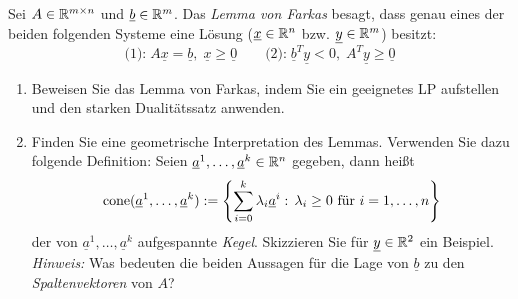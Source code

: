 \documentclass[11pt,german,a4paper,parskip=half-]{scrartcl}
\renewcommand{\u}[1]{\ensuremath{\underline{#1}}} %
\begin{document}
\begin{exercise}{4}
Sei $A \in \mathbb{R}^{m\times n}$ und $\u b \in \R^m$. Das \emph{Lemma von Farkas} besagt, dass genau eines der beiden
folgenden Systeme eine Lösung ($\u x \in \R^n$ bzw. $\u y \in \R^m$) besitzt:
\[ \text{(1):}\; A \u x = \u b,\; \u x \geq \u 0 \qquad \text{(2):}\;\u b^T \u y < 0,\; A^T \u y  \geq \u 0\]
\begin{enumerate}
 \item Beweisen Sie das Lemma von Farkas, indem Sie ein geeignetes LP aufstellen und den starken Dualitätssatz anwenden.
 \item Finden Sie eine geometrische Interpretation des Lemmas. Verwenden Sie dazu folgende Definition: Seien $\u a^1,\dotsc, \u a^k \in \R^n$ gegeben,
 dann heißt
\[ \op{cone}(\u a^1,\dotsc,\u a^k) := \left\{ \sum_{i=0}^k \lambda_i \u a^i:\, \lambda_i \geq 0\text{ für }i=1,\dotsc,n\right\}\]
der von $\u a^1,\dotsc,\u a^k$ aufgespannte \emph{Kegel}. Skizzieren Sie für $\u y \in \R^2$ ein Beispiel.\\
{\it Hinweis:} Was bedeuten die beiden Aussagen für die Lage von $\u b$ zu den \emph{Spaltenvektoren} von $A$?
\end{enumerate}
\end{exercise}
\end{document}
